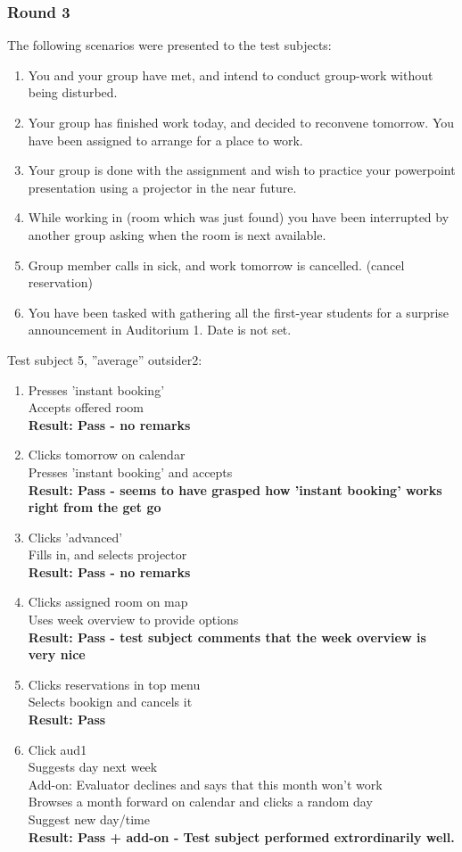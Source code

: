 \subsubsection{Round 3}
The following scenarios were presented to the test subjects:
\begin{enumerate}
\item You and your group have met, and intend to conduct group-work without being disturbed.
\item Your group has finished work today, and decided to reconvene tomorrow. You have been assigned to arrange for a place to work.
\item Your group is done with the assignment and wish to practice your powerpoint presentation using a projector in the near future.
\item While working in (room which was just found) you have been interrupted by another group asking when the room is next available.
\item Group member calls in sick, and work tomorrow is cancelled. (cancel reservation)
\item You have been tasked with gathering all the first-year students for a surprise announcement in Auditorium 1. Date is not set.
\end{enumerate}

Test subject 5, ''average'' outsider2:
\begin{enumerate}
\item Presses 'instant booking' \\
Accepts offered room \\
\textbf{Result: Pass - no remarks}
\item Clicks tomorrow on calendar \\
Presses 'instant booking' and accepts \\
\textbf{Result: Pass - seems to have grasped how 'instant booking' works right from the get go}
\item Clicks 'advanced' \\
Fills in, and selects projector \\
\textbf{Result: Pass - no remarks}
\item Clicks assigned room on map \\
Uses week overview to provide options \\
\textbf{Result: Pass - test subject comments that the week overview is very nice}
\item Clicks reservations in top menu \\
Selects bookign and cancels it \\
\textbf{Result: Pass}
\item Click aud1 \\
Suggests day next week \\
Add-on: Evaluator declines and says that this month won't work \\
Browses a month forward on calendar and clicks a random day \\
Suggest new day/time \\
\textbf{Result: Pass + add-on - Test subject performed extrordinarily well.}
\end{enumerate}


